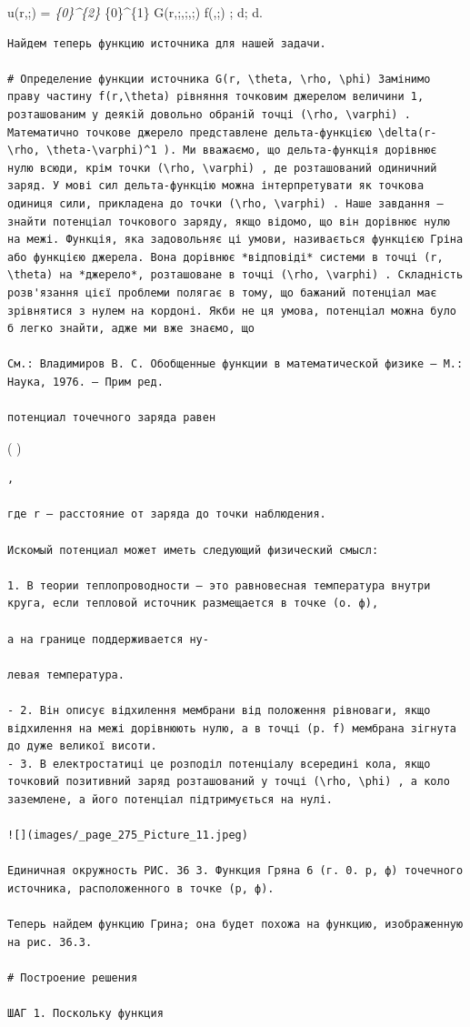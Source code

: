 \documentclass[
  ukrainian,
]{article}
\begin{document}
u\left(r,;\theta\right) = \int\emph{\{0\}\^{}\{2\pi\}
\int}\{0\}\^{}\{1\} G\left(r,;\theta,;\rho,;\varphi\right)
f\left(\rho,;\varphi\right) \rho ; d\rho ; d\varphi.

\begin{verbatim}
Найдем теперь функцию источника для нашей задачи.

# Определение функции источника G(r, \theta, \rho, \phi) Замінимо праву частину f(r,\theta) рівняння точковим джерелом величини 1, розташованим у деякій довольно обраній точці (\rho, \varphi) . Математично точкове джерело представлене дельта-функцією \delta(r-\rho, \theta-\varphi)^1 ). Ми вважаємо, що дельта-функція дорівнює нулю всюди, крім точки (\rho, \varphi) , де розташований одиничний заряд. У мові сил дельта-функцію можна інтерпретувати як точкова одиниця сили, прикладена до точки (\rho, \varphi) . Наше завдання — знайти потенціал точкового заряду, якщо відомо, що він дорівнює нулю на межі. Функція, яка задовольняє ці умови, називається функцією Гріна або функцією джерела. Вона дорівнює *відповіді* системи в точці (r, \theta) на *джерело*, розташоване в точці (\rho, \varphi) . Складність розв'язання цієї проблеми полягає в тому, що бажаний потенціал має зрівнятися з нулем на кордоні. Якби не ця умова, потенціал можна було б легко знайти, адже ми вже знаємо, що

См.: Владимиров В. С. Обобщенные функции в математической физике — М.: Наука, 1976. — Прим ред.

потенциал точечного заряда равен
\end{verbatim}

 \ln \left(  \right)

\begin{verbatim}
,

где r — расстояние от заряда до точки наблюдения.

Искомый потенциал может иметь следующий физический смысл:

1. В теории теплопроводности — это равновесная температура внутри круга, если тепловой источник размещается в точке (о. ф),

а на границе поддерживается ну-

левая температура.

- 2. Він описує відхилення мембрани від положення рівноваги, якщо відхилення на межі дорівнюють нулю, а в точці (p. f) мембрана зігнута до дуже великої висоти.
- 3. В електростатиці це розподіл потенціалу всередині кола, якщо точковий позитивний заряд розташований у точці (\rho, \phi) , а коло заземлене, а його потенціал підтримується на нулі.

![](images/_page_275_Picture_11.jpeg)

Единичная окружность РИС. 36 3. Функция Гряна 6 (г. 0. р, ф) точечного источника, расположенного в точке (р, ф).

Теперь найдем функцию Грина; она будет похожа на функцию, изображенную на рис. 36.3.

# Построение решения

ШАГ 1. Поскольку функция
\end{verbatim}
\end{document}
